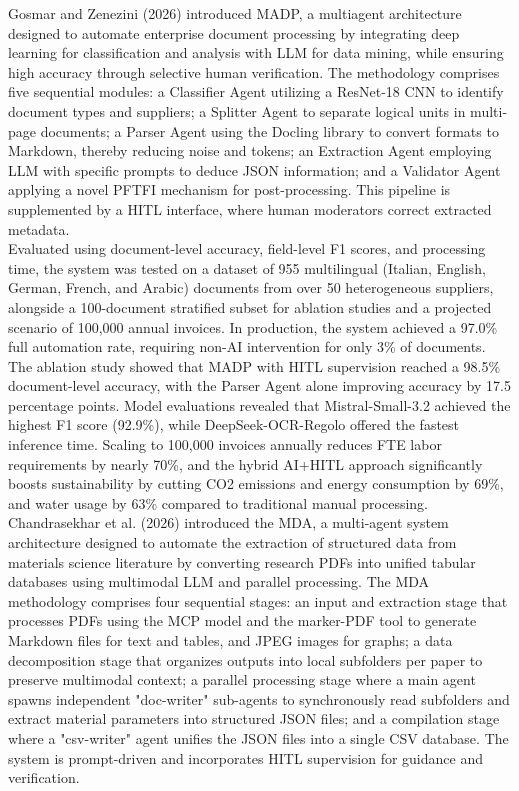 \documentclass[11pt,a4paper]{report}
\begin{document}
Gosmar and Zenezini \cite{Gosmar2026MADPAM} (2026) introduced MADP, a multiagent architecture designed to automate enterprise document processing by integrating deep learning for classification and analysis with \ac{LLM} for data mining, while ensuring high accuracy through selective human verification. The methodology comprises five sequential modules: a Classifier Agent utilizing a ResNet-18 CNN to identify document types and suppliers; a Splitter Agent to separate logical units in multi-page documents; a Parser Agent using the Docling library to convert formats to Markdown, thereby reducing noise and tokens; an Extraction Agent employing \ac{LLM} with specific prompts to deduce JSON information; and a Validator Agent applying a novel \ac{PFTFI} mechanism for post-processing. This pipeline is supplemented by a \ac{HITL} interface, where human moderators correct extracted metadata.\\

Evaluated using document-level accuracy, field-level F1 scores, and processing time, the system was tested on a dataset of 955 multilingual (Italian, English, German, French, and Arabic) documents from over 50 heterogeneous suppliers, alongside a 100-document stratified subset for ablation studies and a projected scenario of 100,000 annual invoices. In production, the system achieved a 97.0\% full automation rate, requiring non-\ac{AI} intervention for only 3\% of documents. The ablation study showed that MADP with \ac{HITL} supervision reached a 98.5\% document-level accuracy, with the Parser Agent alone improving accuracy by 17.5 percentage points. Model evaluations revealed that Mistral-Small-3.2 achieved the highest F1 score (92.9\%), while DeepSeek-OCR-Regolo offered the fastest inference time. Scaling to 100,000 invoices annually reduces \ac{FTE} labor requirements by nearly 70\%, and the hybrid \ac{AI}+\ac{HITL} approach significantly boosts sustainability by cutting CO2 emissions and energy consumption by 69\%, and water usage by 63\% compared to traditional manual processing.\\

Chandrasekhar et al. \cite{Chandrasekhar2026MaterialDA} (2026) introduced the \ac{MDA}, a multi-agent system architecture designed to automate the extraction of structured data from materials science literature by converting research \acp{PDF} into unified tabular databases using multimodal \ac{LLM} and parallel processing. The \ac{MDA} methodology comprises four sequential stages: an input and extraction stage that processes \acp{PDF} using the MCP model and the marker-\ac{PDF} tool to generate Markdown files for text and tables, and JPEG images for graphs; a data decomposition stage that organizes outputs into local subfolders per paper to preserve multimodal context; a parallel processing stage where a main agent spawns independent "doc-writer" sub-agents to synchronously read subfolders and extract material parameters into structured JSON files; and a compilation stage where a "csv-writer" agent unifies the JSON files into a single CSV database. The system is prompt-driven and incorporates \ac{HITL} supervision for guidance and verification.\\
\end{document}
